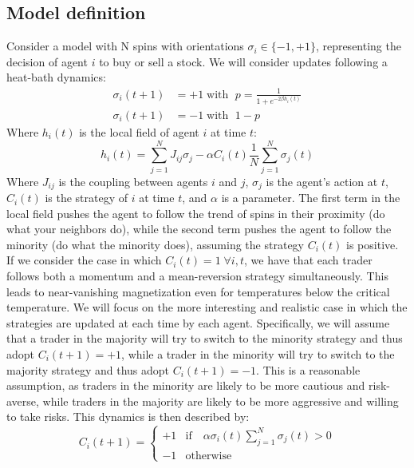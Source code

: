 \subsection{Model definition}
Consider a model with N spins with orientations $\sigma_i\in\{-1,+1\}$, representing the decision of agent $i$ to buy or sell a stock. We will consider updates following a heat-bath dynamics:
\begin{equation}
    \begin{aligned}
        \sigma_i(t+1) &= +1 \;\text{with }\; p = \frac{1}{1+e^{-2\beta h_i(t)}}\\
        \sigma_i(t+1) &= -1 \;\text{with }\; 1-p
    \end{aligned}
    \label{eq:heat_bath}
\end{equation}
Where $h_i(t)$ is the local field of agent $i$ at time $t$:
\begin{equation}
    h_i(t)=\sum_{j=1}^N J_{i j} \sigma_j-\alpha C_i(t) \frac{1}{N} \sum_{j=1}^N \sigma_j(t)
\end{equation}
Where $J_{i j}$ is the coupling between agents $i$ and $j$, $\sigma_j$ is the agent's action at $t$, $C_i(t)$ is the strategy of $i$ at time $t$, and $\alpha$ is a parameter. The first term in the local field pushes the agent to follow the trend of spins in their proximity (do what your neighbors do), while the second term pushes the agent to follow the minority (do what the minority does), assuming the strategy $C_i(t)$ is positive. 
If we consider the case in which $C_i(t) = 1\;\forall i, t$, we have that each trader follows both a momentum and a mean-reversion strategy simultaneously. This leads to near-vanishing magnetization even for temperatures below the critical temperature. 
We will focus on the more interesting and realistic case in which the strategies are updated at each time by each agent. Specifically, we will assume that a trader in the majority will try to switch to the minority strategy and thus adopt $C_i(t+1) = +1$, while a trader in the minority will try to switch to the majority strategy and thus adopt $C_i(t+1) = -1$. This is a reasonable assumption, as traders in the minority are likely to be more cautious and risk-averse, while traders in the majority are likely to be more aggressive and willing to take risks. This dynamics is then described by:
\begin{equation}
    C_i(t+1) = \begin{cases}
        +1 & \text{if} \quad \alpha\sigma_i(t) \sum_{j=1}^N \sigma_j(t)> 0\\
        -1 & \text{otherwise}
    \end{cases}
\end{equation}
